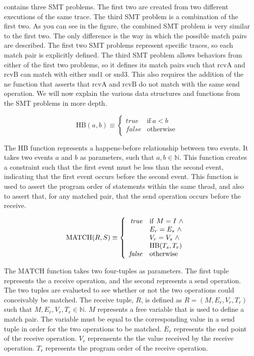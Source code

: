  contains three SMT problems. The first two are created from
two different executions of the same trace. The third SMT problem is a
combination of the first two. As you can see in the figure, the combined SMT
problem is very similar to the first two. The only difference is the way in
which the possible match pairs are described. The first two SMT problems
represent specific traces, so each match pair is explicitly defined. The third
SMT problem allows behaviors from either of the first two problems, so it
defines its match pairs such that $\mathrm{rcvA}$ and $\mathrm{rcvB}$ can match
with either $\mathrm{snd1}$ or $\mathrm{snd3}$. This also requires the addition
of the $\mathrm{ne}$ function that asserts that $\mathrm{rcvA}$ and
$\mathrm{rcvB}$ do not match with the same send operation. We will now explain
the various data structures and functions from the SMT problems in more depth.

\begin{equation}
\mathrm{HB}(a,b) \equiv \left\{ \begin{array}{rl}
  \mathit{true} & \mathrm{if}\ a < b \\
  \mathit{false} & \mathrm{otherwise}\ 
\end{array}
\right .
\end{equation}

The HB function represents a happens-before relationship between two events. It
takes two events $a$ and $b$ as parameters, such that $a,b \in \mathbb{N}$. This
function creates a constraint such that the first event must be less than the
second event, indicating that the first event occurs before the second event.
This function is used to assert the program order of statements within the same
thead, and also to assert that, for any matched pair, that the send operation
occurs before the receive. 

\begin{equation}
\mathrm{MATCH}(R,S) \equiv \left\{ 
\begin{array}{rl}
  \mathit{true} & \mathrm{if}\ M = I~\wedge \\
  & E_r = E_s~\wedge \\
  & V_r = V_s~\wedge \\
  & \mathrm{HB}(T_s,T_r) \\
  \mathit{false} & \mathrm{otherwise}\ 
\end{array}
\right . \\
\end{equation}

The $\mathrm{MATCH}$ function takes two four-tuples as parameters. The first tuple
represents the a receive operation, and the second represents a send operation.
The two tuples are evalueted to see whether or not the two operations could
conceivably be matched.  The receive tuple, $R$, is defined as $R =
(M,E_r,V_r,T_r)$ such that $M,E_r,V_r,T_r \in \mathbb{N}$. $M$ represents a
free variable that is used to define a match pair. The variable must be equal
to the corresponding value in a send tuple in order for the two operations to
be matched. $E_r$ represents the end point of the receive operation. $V_r$
reprensents the the value received by the receive operation. $T_r$ represents
the program order of the receive operation.

